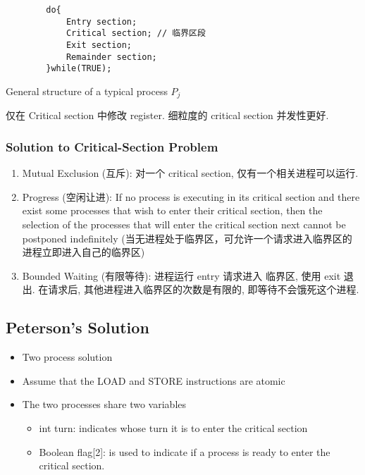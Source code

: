 \begin{code}
    \begin{verbatim}
        do{
            Entry section;
            Critical section; // 临界区段
            Exit section;
            Remainder section;
        }while(TRUE);
    \end{verbatim}
    \caption{General structure of a typical process $P_j$}
\end{code}


仅在 Critical section 中修改 register. 细粒度的 critical section 并发性更好. 

\subsubsection{Solution to Critical-Section Problem}
\begin{enumerate}
    \item Mutual Exclusion (互斥): 对一个 critical section, 仅有一个相关进程可以运行. 
    \item Progress (空闲让进): If no process is executing in its critical section and there exist some processes that wish to enter their critical section, then the selection of the processes that will enter the critical section next cannot be postponed indefinitely (当无进程处于临界区，可允许一个请求进入临界区的进程立即进入自己的临界区)
    \item Bounded Waiting (有限等待): 进程运行 entry 请求进入 临界区, 使用 exit 退出. 在请求后, 其他进程进入临界区的次数是有限的, 即等待不会饿死这个进程. 
\end{enumerate}


\subsection{Peterson’s Solution}
\begin{itemize}
    \item Two process solution
    \item Assume that the LOAD and STORE instructions are atomic
    \item The two processes share two variables
    \begin{itemize}
        \item int turn: indicates whose turn it is to enter the critical section
        \item Boolean flag[2]: is used to indicate if a process is ready to enter the critical section.
    \end{itemize}
\end{itemize}

